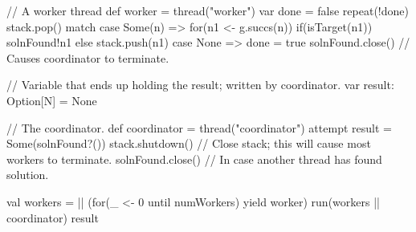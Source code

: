 \begin{answerI}
\begin{scala}
{{    // A worker thread
    def worker = thread("worker"){
      var done = false
      repeat(!done){
        stack.pop() match{
          case Some(n) => 
            for(n1 <- g.succs(n)){
              if(isTarget(n1)) solnFound!n1 else stack.push(n1)
            }
          case None => done = true
        }
      }
      solnFound.close() // Causes coordinator to terminate.
    }

    // Variable that ends up holding the result; written by coordinator. 
    var result: Option[N] = None

    // The coordinator.
    def coordinator = thread("coordinator"){
      attempt{ result = Some(solnFound?()) }{ }
      stack.shutdown() // Close stack; this will cause most workers to terminate.
      solnFound.close() // In case another thread has found solution.
    }

    val workers = || (for(_ <- 0 until numWorkers) yield worker)
    run(workers || coordinator)
    result
  }
}
\end{scala}
\end{answerI}
